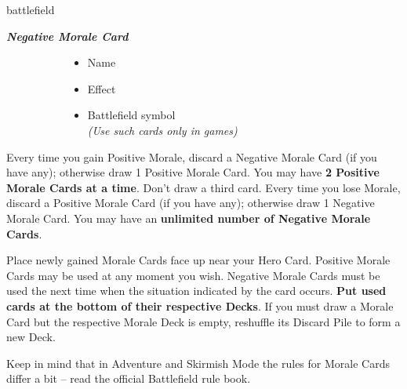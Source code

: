 \begin{multicols*}{2}
\begin{expansion}[before=\vspace*{-11mm}]{battlefield}
\begin{multicols*}{2}
  \textbf{\textit{\textcolor{darkcandyapplered}{Negative Morale Card}}}
\end{multicols*}
\begin{figure}[H]
  \centering
  \footnotesize
  \begin{subfigure}[t]{0.27\linewidth}
    \begin{itemize}
      \item[\textbf{1.}] Name
      \item[\textbf{2.}] Effect
    \end{itemize}
  \end{subfigure}
  \begin{subfigure}[t]{0.7\linewidth}
    \begin{itemize}
      \item[\textbf{3.}] Battlefield symbol\\{\scriptsize\textit{(Use such cards only in  games)}}
    \end{itemize}
  \end{subfigure}
\end{figure}

Every time you gain Positive Morale, discard a Negative Morale Card (if you have any); otherwise draw 1 Positive Morale Card.
You may have \textbf{2 Positive Morale Cards at a time}.
Don't draw a third card.
Every time you lose Morale, discard a Positive Morale Card (if you have any); otherwise draw 1 Negative Morale Card.
You may have an \textbf{unlimited number of Negative Morale Cards}.\par
Place newly gained Morale Cards face up near your Hero Card.
Positive Morale Cards may be used at any moment you wish.
Negative Morale Cards must be used the next time when the situation indicated by the card occurs.
\textbf{Put used cards at the bottom of their respective Decks}.
If you must draw a Morale Card but the respective Morale Deck is empty, reshuffle its Discard Pile to form a new Deck.

Keep in mind that in Adventure and Skirmish Mode the rules for Morale Cards differ a bit -- read the official Battlefield rule book.
\end{expansion}
\end{multicols*}

